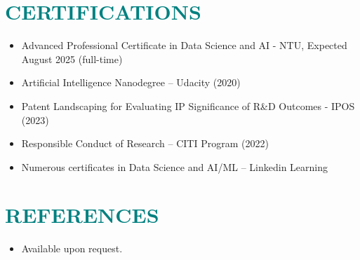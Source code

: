\documentclass[a4paper, 11pt]{article}
\begin{document}
	
\section{\textcolor{teal}{\bf{CERTIFICATIONS}}}

	\vspace{3pt}
	
	\begin{itemize}[leftmargin=*, itemsep=-1mm]
		
		\item Advanced Professional Certificate in Data Science and AI - NTU, Expected August 2025 (full-time)
		
		\item Artificial Intelligence Nanodegree – Udacity (2020)
		
		\item Patent Landscaping for Evaluating IP Significance of R\&D Outcomes - IPOS (2023)
		
		\item Responsible Conduct of Research – CITI Program (2022)
		
		\item Numerous certificates in Data Science and AI/ML – Linkedin Learning
		
	\end{itemize}
	
	
\section{\textcolor{teal}{\bf{REFERENCES}}}

	\vspace{3pt}
	
	\begin{itemize}[leftmargin=*, itemsep=-1mm]
		
		\item Available upon request.
		
	\end{itemize}
	
	
			
\end{document}
